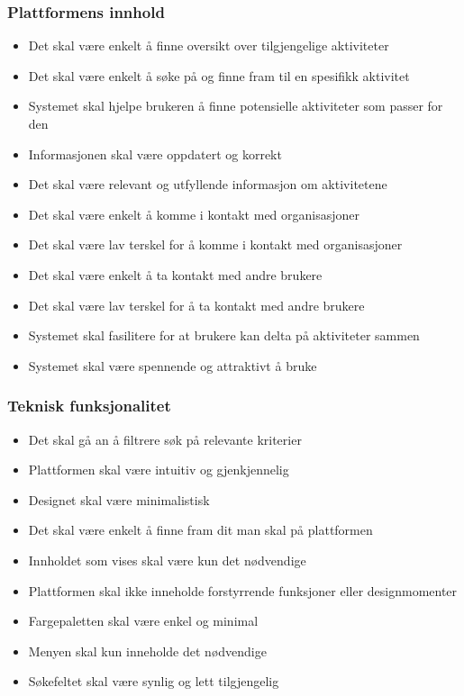 \subsubsection{Plattformens innhold}
\begin{itemize}
\item Det skal være enkelt å finne oversikt over tilgjengelige aktiviteter
\item Det skal være enkelt å søke på og finne fram til en spesifikk aktivitet
\item Systemet skal hjelpe brukeren å finne potensielle aktiviteter som passer for den
\item Informasjonen skal være oppdatert og korrekt
\item Det skal være relevant og utfyllende informasjon om aktivitetene
\item Det skal være enkelt å komme i kontakt med organisasjoner
\item Det skal være lav terskel for å komme i kontakt med organisasjoner
\item Det skal være enkelt å ta kontakt med andre brukere
\item Det skal være lav terskel for å ta kontakt med andre brukere
\item Systemet skal fasilitere for at brukere kan delta på aktiviteter sammen
\item Systemet skal være spennende og attraktivt å bruke
\end{itemize}

\subsubsection{Teknisk funksjonalitet}
\begin{itemize}
\item Det skal gå an å filtrere søk på relevante kriterier
\item Plattformen skal være intuitiv og gjenkjennelig
\item Designet skal være minimalistisk
\item Det skal være enkelt å finne fram dit man skal på plattformen
\item Innholdet som vises skal være kun det nødvendige
\item Plattformen skal ikke inneholde forstyrrende funksjoner eller designmomenter
\item Fargepaletten skal være enkel og minimal
\item Menyen skal kun inneholde det nødvendige
\item Søkefeltet skal være synlig og lett tilgjengelig
\end{itemize}

